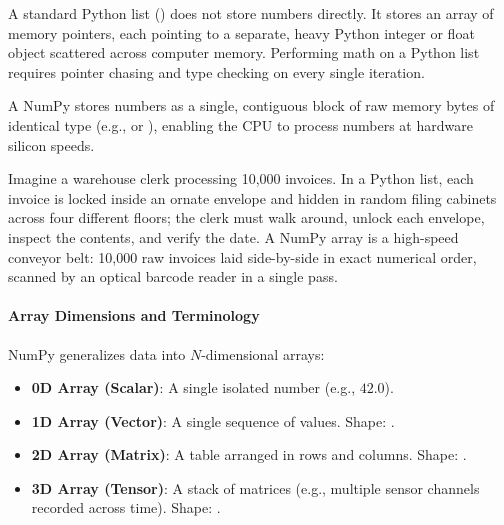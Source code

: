 \begin{keyidea}
A standard Python list (\code{[1.2, 4.8, -2.1]}) does not store numbers directly. It stores an array of memory pointers, each pointing to a separate, heavy Python integer or float object scattered across computer memory. Performing math on a Python list requires pointer chasing and type checking on every single iteration. 

A NumPy \textbf{} stores numbers as a single, contiguous block of raw memory bytes of identical type (e.g.,  or ), enabling the CPU to process numbers at hardware silicon speeds.
\end{keyidea}

\begin{analogy}
Imagine a warehouse clerk processing 10,000 invoices. In a Python list, each invoice is locked inside an ornate envelope and hidden in random filing cabinets across four different floors; the clerk must walk around, unlock each envelope, inspect the contents, and verify the date. A NumPy array is a high-speed conveyor belt: 10,000 raw invoices laid side-by-side in exact numerical order, scanned by an optical barcode reader in a single pass.
\end{analogy}

\paragraph{Array Dimensions and Terminology}
NumPy generalizes data into $N$-dimensional arrays:
\begin{itemize}
    \item \textbf{0D Array (Scalar)}: A single isolated number (e.g., $42.0$).
    \item \textbf{1D Array (Vector)}: A single sequence of values. Shape: .
    \item \textbf{2D Array (Matrix)}: A table arranged in rows and columns. Shape: .
    \item \textbf{3D Array (Tensor)}: A stack of matrices (e.g., multiple sensor channels recorded across time). Shape: .
\end{itemize}

